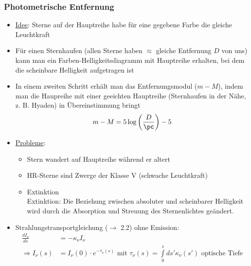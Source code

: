\subsubsection{Photometrische Entfernung}
\begin{itemize}
	\item \underline{Idee}: Sterne auf der Hauptreihe habe für eine gegebene Farbe die gleiche Leuchtkraft
	\item Für einen Sternhaufen (allen Sterne haben $\approx $ gleiche Entfernung $D$ von uns) kann man ein Farben-Helligkeitsdiagramm mit Hauptreihe erhalten, bei dem die scheinbare Helligkeit aufgetragen ist
	\item In einem zweiten Schritt erhält man das Entfernungsmodul ($m-M$), indem man die Haupreihe mit einer geeichten Hauptreihe (Sternhaufen in der Nähe, z. B. Hyaden) in Übereinstimmung bringt
		\begin{equation*}
			m-M=5\log\left(\frac{D}{\si{\pc}}\right)-5
		\end{equation*}
		\begin{figure}[H]
			\centering
		\end{figure}
	\item \underline{Probleme}:
		\begin{itemize}[label={$\cdot$}]
			\item Stern wandert auf Hauptreihe während er altert
			\item HR-Sterne sind Zwerge der Klasse V (schwache Leuchtkraft)
			\item Extinktion\\
				Extinktion: Die Beziehung zwischen absoluter und scheinbarer Helligkeit wird durch die Absorption und Streuung des Sternenlichtes geändert.
		\end{itemize}
	\item Strahlungstransportgleichung ($\to$ 2.2) ohne Emission:
		\begin{align*}
			\frac{dI_\nu}{ds}&=-\kappa_\nu I_\nu\\
			\Rightarrow I_\nu(s)&=I_\nu(0)\cdot e^{-\tau_\nu(s)} \text{ mit } \tau_\nu(s)=\int\limits_{0}^sds'\kappa_\nu(s') \text{ optische Tiefe}
		\end{align*}

\end{itemize}

